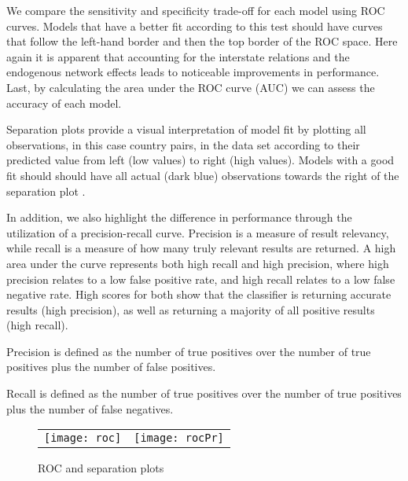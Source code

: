 We compare the sensitivity and specificity trade-off for each model using ROC curves. Models that have a better fit according to this test should have curves that follow the left-hand border and then the top border of the ROC space. Here again it is apparent that accounting for the interstate relations and the endogenous network effects leads to noticeable improvements in performance. Last, by calculating the area under the ROC curve (AUC) we can assess the accuracy of each model.

Separation plots provide a visual interpretation of model fit by plotting all observations, in this case country pairs, in the data set according to their predicted value from left (low values) to right (high values). Models with a good fit should should have all actual (dark blue) observations towards the right of the separation plot \citep{greenhill:etal:2011}.

In addition, we also highlight the difference in performance through the utilization of a precision-recall curve. Precision is a measure of result relevancy, while recall is a measure of how many truly relevant results are returned. A high area under the curve represents both high recall and high precision, where high precision relates to a low false positive rate, and high recall relates to a low false negative rate. High scores for both show that the classifier is returning accurate results (high precision), as well as returning a majority of all positive results (high recall). 

Precision is defined as the number of true positives over the number of true positives plus the number of false positives. 

Recall is defined as the number of true positives over the number of true positives plus the number of false negatives. 

\begin{figure}[ht]
	\centering
	\begin{tabular}{cc}
	\texttt{[image: roc]} & 
	\texttt{[image: rocPr]}	
	\end{tabular}
	\caption{ROC and separation plots}
	\label{fig:roc}
\end{figure}

% 